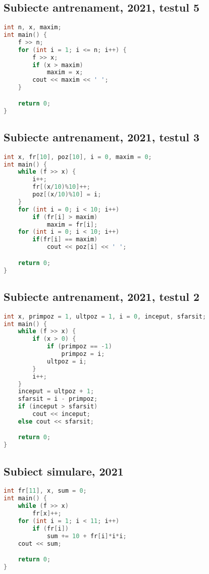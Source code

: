 \documentclass[10pt, a4paper, twocolumn]{article}
\begin{document}
\subsection*{Subiecte antrenament, 2021, testul 5}
\begin{lstlisting}[language=C++]
int n, x, maxim;
int main() {
    f >> n;
    for (int i = 1; i <= n; i++) {
        f >> x;
        if (x > maxim)
            maxim = x;
        cout << maxim << ' ';
    }

    return 0;
}
\end{lstlisting}
\vspace{0.5cm}

\subsection*{Subiecte antrenament, 2021, testul 3}
\begin{lstlisting}[language=C++]
int x, fr[10], poz[10], i = 0, maxim = 0;
int main() {
    while (f >> x) {
        i++;
        fr[(x/10)%10]++;
        poz[(x/10)%10] = i;
    }
    for (int i = 0; i < 10; i++)
        if (fr[i] > maxim)
            maxim = fr[i];
    for (int i = 0; i < 10; i++)
        if(fr[i] == maxim)
            cout << poz[i] << ' ';

    return 0;
}
\end{lstlisting}
\vspace{0.5cm}

\subsection*{Subiecte antrenament, 2021, testul 2}
\begin{lstlisting}[language=C++]
int x, primpoz = 1, ultpoz = 1, i = 0, inceput, sfarsit;
int main() {
    while (f >> x) {
        if (x > 0) {
            if (primpoz == -1)
                primpoz = i;
            ultpoz = i;
        }
        i++;
    }
    inceput = ultpoz + 1;
    sfarsit = i - primpoz;
    if (inceput > sfarsit)
        cout << inceput;
    else cout << sfarsit;

    return 0;
}
\end{lstlisting}
\vspace{0.5cm}

\subsection*{Subiect simulare, 2021}
\begin{lstlisting}[language=C++]
int fr[11], x, sum = 0;
int main() {
    while (f >> x)
        fr[x]++;
    for (int i = 1; i < 11; i++)
        if (fr[i])
            sum += 10 + fr[i]*i*i;
    cout << sum;

    return 0;
}
\end{lstlisting}
\vspace{0.5cm}
\end{document}

